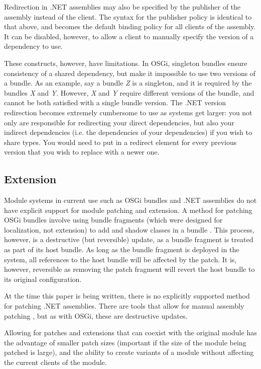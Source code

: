 Redirection in .NET assemblies may also be specified by the publisher of the
assembly instead of the client. The syntax for the publisher policy is identical
to that above, and becomes the default binding policy for all clients of the assembly.
It can be disabled, however, to allow a client to manually specify the version of
a dependency to use.

These constructs, however, have limitations. In OSGi, singleton bundles ensure
consistency of a shared dependency, but make it impossible to use two versions of
a bundle. As an example, say a bundle \textit{Z} is a singleton, and it is required
by the bundles \textit{X} and \textit{Y}. However, \textit{X} and \textit{Y} require 
different versions of the bundle, and cannot be both satisfied with a single bundle version.
The .NET version redirection becomes extremely cumbersome to use as systems get larger: you
not only are responsible for redirecting your direct dependencies, but also your indirect
dependencies (i.e. the dependencies of your dependencies) if you wish to share types. You
would need to put in a redirect element for every previous version that you wish to replace
with a newer one.

\subsection{Extension}

Module systems in current use such as OSGi bundles and .NET assemblies do not 
have explicit support for module patching and extension. A method for patching OSGi bundles
involve using bundle fragments (which were designed for localization, not extension)
to add and shadow classes in a bundle \cite{patchingosgi}. This process, however, is
a destructive (but reversible) update, as a bundle fragment is treated as part of its 
host bundle. As long as the bundle fragment is deployed in the system, all references 
to the host bundle will be affected by the patch. It is, however, reversible as 
removing the patch fragment will revert the host bundle to its original configuration.

At the time this paper is being written, there is no explicitly supported method for
patching .NET assemblies. There are tools that allow for manual assembly patching 
\cite{reflexil, monocecil}, but as with OSGi, these are destructive updates.

Allowing for patches and extensions that can coexist with the original module has the
advantage of smaller patch sizes (important if the size of the module being patched is
large), and the ability to create variants of a module without affecting the current
clients of the module.


